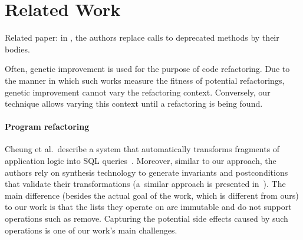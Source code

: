\documentclass[runningheads,a4paper]{llncs}
\begin{document}
\section{Related Work}

Related paper: in \cite{DBLP:conf/paste/Perkins05}, the authors
replace calls to deprecated methods by their bodies.

Often, genetic improvement
\cite{DBLP:journals/dagstuhl-reports/PetkeGFL18} is used for the
purpose of code refactoring. Due to the manner in which such works measure
the fitness of potential refactorings, genetic improvement cannot vary
the refactoring context.  Conversely, our technique allows varying this
context until a refactoring is being found.

\paragraph{Program refactoring}

Cheung et al.~describe a system that automatically transforms fragments of
application logic into SQL queries~\cite{DBLP:conf/pldi/CheungSM13}. 
Moreover, similar to our approach, the authors rely on synthesis technology
to generate invariants and postconditions that validate their
transformations (a~similar approach is presented
in~\cite{DBLP:conf/cc/IuCZ10}).  The main difference (besides the actual
goal of the work, which is different from ours) to our work is that the
lists they operate on are immutable and do not support operations such as
remove.  Capturing the potential side effects caused by such operations is
one of our work's main challenges.
\end{document}
